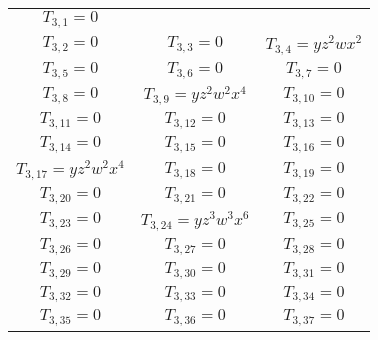 \documentclass[12pt]{memoireuqam1.3}
\begin{document}
\begin{longtable}{|c|c|c|}
$T_{3,1}= 0$\\

$T_{3,2}= 0$&

$T_{3,3}= 0$&

$T_{3,4}= yz^2wx^2$\\

$T_{3,5}= 0$&

$T_{3,6}= 0$&

$T_{3,7}= 0$\\

$T_{3,8}= 0$&

$T_{3,9}= yz^2w^2x^4$&

$T_{3,10}= 0$\\

$T_{3,11}= 0$&

$T_{3,12}= 0$&

$T_{3,13}= 0$\\

$T_{3,14}= 0$&

$T_{3,15}= 0$&

$T_{3,16}= 0$\\

$T_{3,17}= yz^2w^2x^4$&

$T_{3,18}= 0$&

$T_{3,19}= 0$\\

$T_{3,20}= 0$&

$T_{3,21}= 0$&

$T_{3,22}= 0$\\

$T_{3,23}= 0$&

$T_{3,24}= yz^3w^3x^6$&

$T_{3,25}= 0$\\

$T_{3,26}= 0$&

$T_{3,27}= 0$&

$T_{3,28}= 0$\\

$T_{3,29}= 0$&

$T_{3,30}= 0$&

$T_{3,31}= 0$\\

$T_{3,32}= 0$&

$T_{3,33}= 0$&

$T_{3,34}= 0$\\

$T_{3,35}= 0$&

$T_{3,36}= 0$&

$T_{3,37}= 0$\\


\end{longtable}
\end{document}
